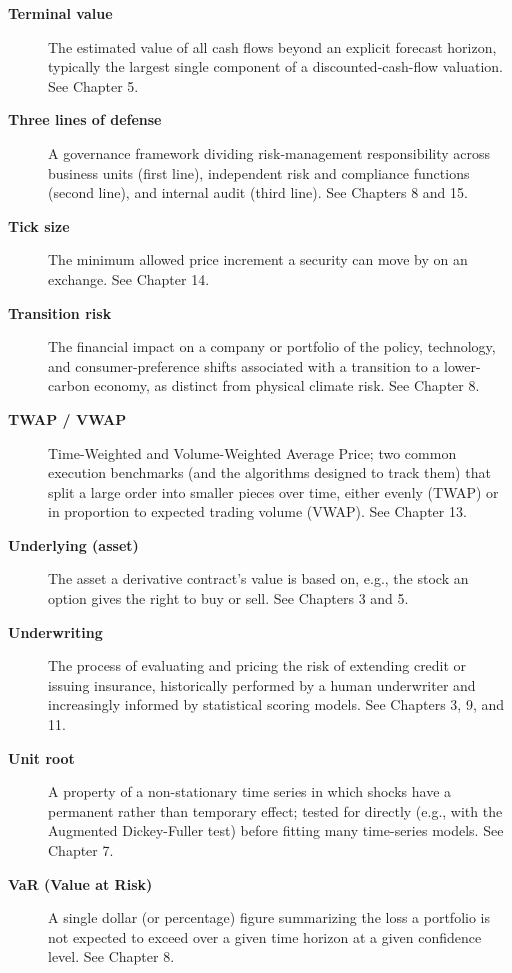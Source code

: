 \documentclass[../ai_in_finance]{subfiles}
\begin{document}
\begin{description}
\item[\textbf{Terminal value}] The estimated value of all cash flows beyond an explicit forecast horizon, typically the largest single component of a discounted-cash-flow valuation. See Chapter 5.

\item[\textbf{Three lines of defense}] A governance framework dividing risk-management responsibility across business units (first line), independent risk and compliance functions (second line), and internal audit (third line). See Chapters 8 and 15.

\item[\textbf{Tick size}] The minimum allowed price increment a security can move by on an exchange. See Chapter 14.

\item[\textbf{Transition risk}] The financial impact on a company or portfolio of the policy, technology, and consumer-preference shifts associated with a transition to a lower-carbon economy, as distinct from physical climate risk. See Chapter 8.

\item[\textbf{TWAP / VWAP}] Time-Weighted and Volume-Weighted Average Price; two common execution benchmarks (and the algorithms designed to track them) that split a large order into smaller pieces over time, either evenly (TWAP) or in proportion to expected trading volume (VWAP). See Chapter 13.

\item[\textbf{Underlying (asset)}] The asset a derivative contract's value is based on, e.g., the stock an option gives the right to buy or sell. See Chapters 3 and 5.

\item[\textbf{Underwriting}] The process of evaluating and pricing the risk of extending credit or issuing insurance, historically performed by a human underwriter and increasingly informed by statistical scoring models. See Chapters 3, 9, and 11.

\item[\textbf{Unit root}] A property of a non-stationary time series in which shocks have a permanent rather than temporary effect; tested for directly (e.g., with the Augmented Dickey-Fuller test) before fitting many time-series models. See Chapter 7.

\item[\textbf{VaR (Value at Risk)}] A single dollar (or percentage) figure summarizing the loss a portfolio is not expected to exceed over a given time horizon at a given confidence level. See Chapter 8.


\end{description}
\end{document}
